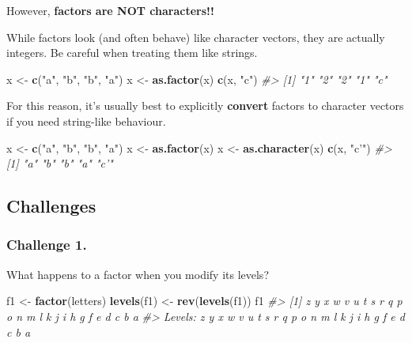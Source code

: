 \documentclass[]{book}
\newenvironment{Shaded}{\begin{snugshade}}{\end{snugshade}}
\newcommand{\CommentTok}[1]{\textcolor[rgb]{0.56,0.35,0.01}{\textit{#1}}}
\newcommand{\KeywordTok}[1]{\textcolor[rgb]{0.13,0.29,0.53}{\textbf{#1}}}
\newcommand{\NormalTok}[1]{#1}
\newcommand{\StringTok}[1]{\textcolor[rgb]{0.31,0.60,0.02}{#1}}
\begin{document}
However, \textbf{factors are NOT characters!!}

While factors look (and often behave) like character vectors, they are actually integers. Be careful when treating them like strings.

\begin{Shaded}
\begin{Highlighting}[]
\NormalTok{x <-}\StringTok{ }\KeywordTok{c}\NormalTok{(}\StringTok{"a"}\NormalTok{, }\StringTok{"b"}\NormalTok{, }\StringTok{"b"}\NormalTok{, }\StringTok{"a"}\NormalTok{)}
\NormalTok{x <-}\StringTok{ }\KeywordTok{as.factor}\NormalTok{(x)}
\KeywordTok{c}\NormalTok{(x, }\StringTok{"c"}\NormalTok{)}
\CommentTok{#> [1] "1" "2" "2" "1" "c"}
\end{Highlighting}
\end{Shaded}

For this reason, it's usually best to explicitly \textbf{convert} factors to character vectors if you need string-like behaviour.

\begin{Shaded}
\begin{Highlighting}[]
\NormalTok{x <-}\StringTok{ }\KeywordTok{c}\NormalTok{(}\StringTok{"a"}\NormalTok{, }\StringTok{"b"}\NormalTok{, }\StringTok{"b"}\NormalTok{, }\StringTok{"a"}\NormalTok{)}
\NormalTok{x <-}\StringTok{ }\KeywordTok{as.factor}\NormalTok{(x)}
\NormalTok{x <-}\StringTok{ }\KeywordTok{as.character}\NormalTok{(x)}
\KeywordTok{c}\NormalTok{(x, }\StringTok{"c'"}\NormalTok{)}
\CommentTok{#> [1] "a"  "b"  "b"  "a"  "c'"}
\end{Highlighting}
\end{Shaded}

\hypertarget{challenges-7}{%
\subsection{Challenges}\label{challenges-7}}

\hypertarget{challenge-1.-2}{%
\subsubsection*{Challenge 1.}\label{challenge-1.-2}}

What happens to a factor when you modify its levels?

\begin{Shaded}
\begin{Highlighting}[]
\NormalTok{f1 <-}\StringTok{ }\KeywordTok{factor}\NormalTok{(letters)}
\KeywordTok{levels}\NormalTok{(f1) <-}\StringTok{ }\KeywordTok{rev}\NormalTok{(}\KeywordTok{levels}\NormalTok{(f1))}
\NormalTok{f1}
\CommentTok{#>  [1] z y x w v u t s r q p o n m l k j i h g f e d c b a}
\CommentTok{#> Levels: z y x w v u t s r q p o n m l k j i h g f e d c b a}
\end{Highlighting}
\end{Shaded}
\end{document}
